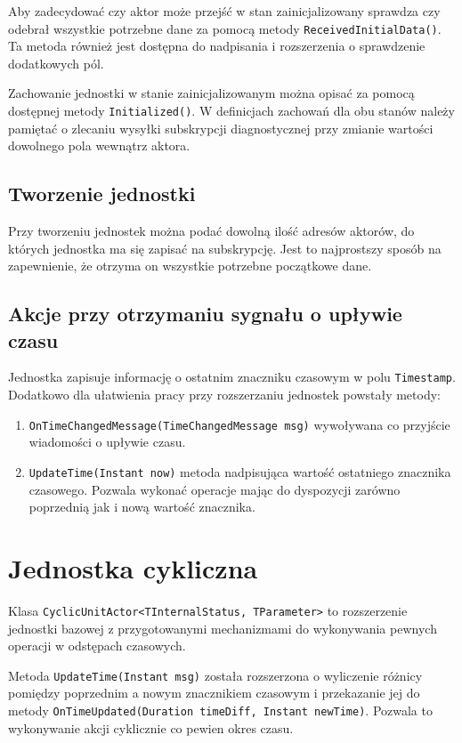 Aby zadecydować czy aktor może przejść w stan zainicjalizowany sprawdza czy odebrał wszystkie potrzebne dane za pomocą metody \lstinline{ReceivedInitialData()}. Ta metoda również jest dostępna do nadpisania i rozszerzenia o sprawdzenie dodatkowych pól.

Zachowanie jednostki w stanie zainicjalizowanym można opisać za pomocą dostępnej metody \lstinline{Initialized()}. 
W definicjach zachowań dla obu stanów należy pamiętać o zlecaniu wysyłki subskrypcji diagnostycznej przy zmianie wartości dowolnego pola wewnątrz aktora.

\subsection*{Tworzenie jednostki}
Przy tworzeniu jednostek można podać dowolną ilość adresów aktorów, do których jednostka ma się zapisać na subskrypcję. Jest to najprostszy sposób na zapewnienie, że otrzyma on wszystkie potrzebne początkowe dane. 

\subsection*{Akcje przy otrzymaniu sygnału o upływie czasu}
Jednostka zapisuje informację o ostatnim znaczniku czasowym w polu \lstinline{Timestamp}. Dodatkowo dla ułatwienia pracy przy rozszerzaniu jednostek powstały metody:
\begin{enumerate} 
    \item \lstinline{OnTimeChangedMessage(TimeChangedMessage msg)} wywoływana co przyjście wiadomości o upływie czasu.
    \item \lstinline{UpdateTime(Instant now)} metoda nadpisująca wartość ostatniego znacznika czasowego. Pozwala wykonać operacje mając do dyspozycji zarówno poprzednią jak i nową wartość znacznika. 
\end{enumerate}

\section{Jednostka cykliczna} \label{subsec:cyclicUnit}
Klasa \lstinline{CyclicUnitActor<TInternalStatus, TParameter>} to rozszerzenie jednostki bazowej z przygotowanymi mechanizmami do wykonywania pewnych operacji w odstępach czasowych. 

Metoda \lstinline{UpdateTime(Instant msg)} została rozszerzona o wyliczenie różnicy pomiędzy poprzednim a nowym znacznikiem czasowym i przekazanie jej do metody \lstinline{OnTimeUpdated(Duration timeDiff, Instant newTime)}. Pozwala to wykonywanie akcji cyklicznie co pewien okres czasu. 

